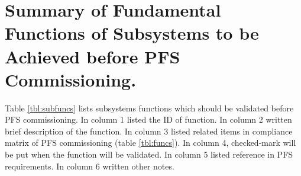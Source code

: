 

\section{Summary of Fundamental Functions of Subsystems to be Achieved before PFS Commissioning.}
Table \ref{tbl:subfuncs} lists subsystems functions which should be validated before PFS commissioning.
In column 1 listed the ID of function.
In column 2 written brief description of the function.
In column 3 listed related items in compliance matrix of PFS commissioning (table \ref{tbl:funcs}).
In column 4, checked-mark will be put when the function will be validated.
In column 5 listed reference in PFS requirements.
In column 6 written other notes.

